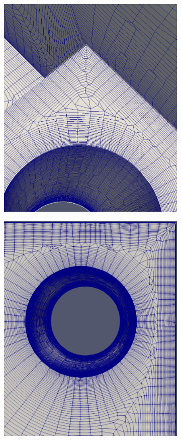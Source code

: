 \begin{figure}
	\centering
	\begin{subfigure}{.5\textwidth}
		\centering
		\includegraphics[width=0.9\linewidth]{img/r/joint-x0.004-g1.04-a5/closeUp.eps}
		\caption{}
		\label{closeUp1}
	\end{subfigure}%
	\begin{subfigure}{.5\textwidth}
		\centering
		\includegraphics[width=0.9\linewidth]{img/r/joint-x0.004-g1.04-a5/bottomCloseUp.eps}

\end{subfigure}
\end{figure}
